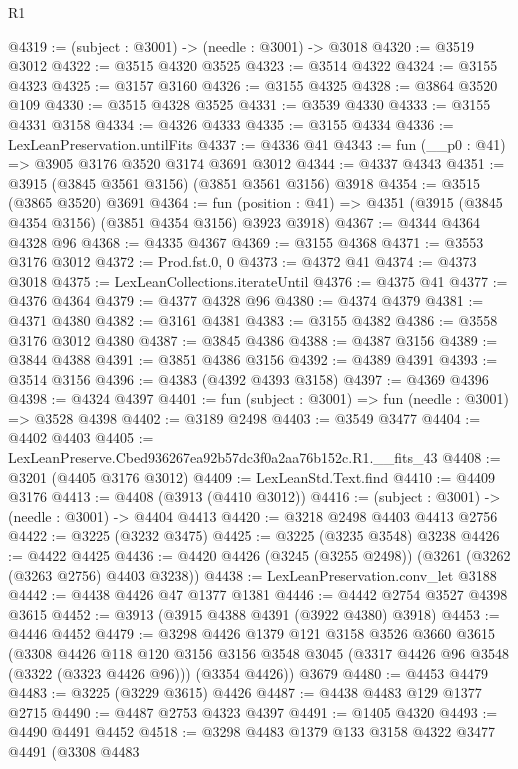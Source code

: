 \begin{lexlean}{R1}
\begin{coremodule}
@4319 := (subject : @3001) -> (needle : @3001) -> @3018
@4320 := @3519 @3012
@4322 := @3515 @4320 @3525
@4323 := @3514 @4322
@4324 := @3155 @4323
@4325 := @3157 @3160
@4326 := @3155 @4325
@4328 := @3864 @3520 @109
@4330 := @3515 @4328 @3525
@4331 := @3539 @4330
@4333 := @3155 @4331 @3158
@4334 := @4326 @4333
@4335 := @3155 @4334
@4336 := LexLeanPreservation.untilFits
@4337 := @4336 @41
@4343 := fun (__p0 : @41) => @3905 @3176 @3520 @3174 @3691 @3012
@4344 := @4337 @4343
@4351 := @3915 (@3845 @3561 @3156) (@3851 @3561 @3156) @3918
@4354 := @3515 (@3865 @3520) @3691
@4364 := fun (position : @41) => @4351 (@3915 (@3845 @4354 @3156) (@3851 @4354 @3156) @3923 @3918)
@4367 := @4344 @4364 @4328 @96
@4368 := @4335 @4367
@4369 := @3155 @4368
@4371 := @3553 @3176 @3012
@4372 := Prod.fst.{0, 0}
@4373 := @4372 @41
@4374 := @4373 @3018
@4375 := LexLeanCollections.iterateUntil
@4376 := @4375 @41
@4377 := @4376 @4364
@4379 := @4377 @4328 @96
@4380 := @4374 @4379
@4381 := @4371 @4380
@4382 := @3161 @4381
@4383 := @3155 @4382
@4386 := @3558 @3176 @3012 @4380
@4387 := @3845 @4386
@4388 := @4387 @3156
@4389 := @3844 @4388
@4391 := @3851 @4386 @3156
@4392 := @4389 @4391
@4393 := @3514 @3156
@4396 := @4383 (@4392 @4393 @3158)
@4397 := @4369 @4396
@4398 := @4324 @4397
@4401 := fun (subject : @3001) => fun (needle : @3001) => @3528 @4398
@4402 := @3189 @2498
@4403 := @3549 @3477
@4404 := @4402 @4403
@4405 := LexLeanPreserve.Cbed936267ea92b57dc3f0a2aa76b152c.R1.__fits_43
@4408 := @3201 (@4405 @3176 @3012)
@4409 := LexLeanStd.Text.find
@4410 := @4409 @3176
@4413 := @4408 (@3913 (@4410 @3012))
@4416 := (subject : @3001) -> (needle : @3001) -> @4404 @4413
@4420 := @3218 @2498 @4403 @4413 @2756
@4422 := @3225 (@3232 @3475)
@4425 := @3225 (@3235 @3548) @3238
@4426 := @4422 @4425
@4436 := @4420 @4426 (@3245 (@3255 @2498)) (@3261 (@3262 (@3263 @2756) @4403 @3238))
@4438 := LexLeanPreservation.conv_let @3188
@4442 := @4438 @4426 @47 @1377 @1381
@4446 := @4442 @2754 @3527 @4398 @3615
@4452 := @3913 (@3915 @4388 @4391 (@3922 @4380) @3918)
@4453 := @4446 @4452
@4479 := @3298
    @4426
    @1379
    @121
    @3158
    @3526
    @3660
    @3615
    (@3308
      @4426
      @118
      @120
      @3156
      @3156
      @3548
      @3045
      (@3317 @4426 @96 @3548 (@3322 (@3323 @4426 @96)))
      (@3354 @4426))
    @3679
@4480 := @4453 @4479
@4483 := @3225 (@3229 @3615) @4426
@4487 := @4438 @4483 @129 @1377 @2715
@4490 := @4487 @2753 @4323 @4397
@4491 := @1405 @4320
@4493 := @4490 @4491 @4452
@4518 := @3298
    @4483
    @1379
    @133
    @3158
    @4322
    @3477
    @4491
    (@3308
      @4483

\end{coremodule}
\end{lexlean}
